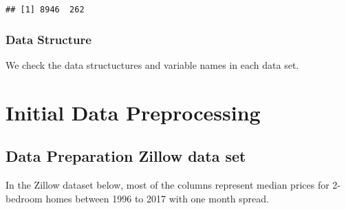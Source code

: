 \documentclass[
]{article}
\begin{document}
\begin{verbatim}
## [1] 8946  262
\end{verbatim}

\hypertarget{data-structure}{%
\subsubsection{Data Structure}\label{data-structure}}

We check the data structuctures and variable names in each data set.

\hypertarget{initial-data-preprocessing}{%
\section{Initial Data Preprocessing}\label{initial-data-preprocessing}}

\hypertarget{data-preparation-zillow-data-set}{%
\subsection{Data Preparation Zillow data
set}\label{data-preparation-zillow-data-set}}

In the Zillow dataset below, most of the columns represent median prices
for 2-bedroom homes between 1996 to 2017 with one month spread.
\end{document}
